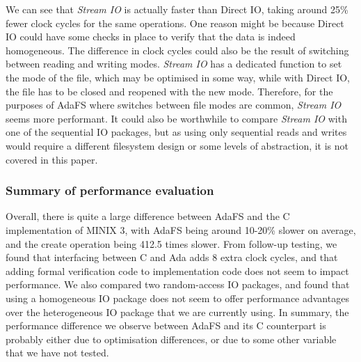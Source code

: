 We can see that \textit{Stream IO} is actually faster than Direct IO, taking around 25\% fewer clock cycles for the same operations.
One reason might be because Direct IO could have some checks in place to verify that the data is indeed homogeneous.
The difference in clock cycles could also be the result of switching between reading and writing modes.
\textit{Stream IO} has a dedicated function to set the mode of the file, which may be optimised in some way, while with Direct IO, the file has to be closed and reopened with the new mode.
Therefore, for the purposes of AdaFS where switches between file modes are common, \textit{Stream IO} seems more performant.
It could also be worthwhile to compare \textit{Stream IO} with one of the sequential IO packages, but as using only sequential reads and writes would require a different filesystem design or some levels of abstraction, it is not covered in this paper.

\subsubsection{Summary of performance evaluation}
Overall, there is quite a large difference between AdaFS and the C implementation of MINIX 3, with AdaFS being around 10-20\% slower on average, and the create operation being 412.5 times slower.
From follow-up testing, we found that interfacing between C and Ada adds 8 extra clock cycles, and that adding formal verification code to implementation code does not seem to impact performance.
We also compared two random-access IO packages, and found that using a homogeneous IO package does not seem to offer performance advantages over the heterogeneous IO package that we are currently using.
In summary, the performance difference we observe between AdaFS and its C counterpart is probably either due to optimisation differences, or due to some other variable that we have not tested.
\clearpage
